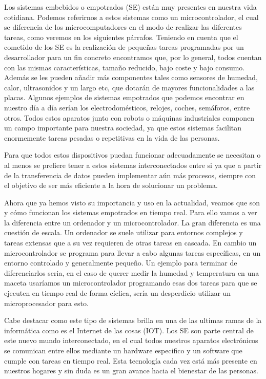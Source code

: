 
Los sistemas embebidos o empotrados (SE) están muy presentes en nuestra vida cotidiana. Podemos referirnos a estos sistemas como un microcontrolador, el cual se diferencia de los microcomputadores en el modo de realizar las diferentes tareas, como veremos en los siguientes párrafos. Teniendo en cuenta que el cometido de los SE es la realización de pequeñas tareas programadas por un desarrollador para un fin concreto encontramos que, por lo general, todos cuentan con las mismas características, tamaño reducido, bajo coste y bajo consumo. Además se les pueden añadir más componentes tales como sensores de humedad, calor, ultrasonidos y un largo etc, que dotarán de mayores funcionalidades a las placas. Algunos ejemplos de sistemas empotrados que podemos encontrar en nuestro día a día serían los electrodomésticos, relojes, coches, semáforos, entre otros. Todos estos aparatos junto con robots o máquinas industriales componen un campo importante para nuestra sociedad, ya que estos sistemas facilitan enormemente tareas pesadas o repetitivas en la vida de las personas. 

Para que todos estos dispositivos puedan funcionar adecuadamente se necesitan o al menos se prefiere tener a estos sistemas interconectados entre si ya que a partir de la transferencia de datos pueden implementar aún más procesos, siempre con el objetivo de ser más eficiente a la hora de solucionar un problema.


Ahora que ya hemos visto su importancia y uso en la actualidad, veamos que son y cómo funcionan los sistemas empotrados en tiempo real. Para ello vamos a ver la diferencia entre un ordenador y un microcontrolador. La gran diferencia es una cuestión de escala. Un ordenador se suele utilizar para entornos complejos y tareas extensas que a su vez requieren de otras tareas en cascada. En cambio un microcontrolador se programa para llevar a cabo algunas tareas específicas, en un entorno controlado y generalmente pequeño. Un ejemplo para terminar de diferenciarlos seria, en el caso de querer medir la humedad y temperatura en una maceta usaríamos un microcontrolador programando esas dos tareas para que se ejecuten en tiempo real de forma cíclica, sería un desperdicio utilizar un microprocesador para esto.

Cabe destacar como este tipo de sistemas brilla en una de las ultimas ramas de la informática como es el Internet de las cosas (IOT). Los SE son parte central de este nuevo mundo interconectado, en el cual todos nuestros aparatos electrónicos se comunican entre ellos mediante un hardware especifico y un software que cumple con tareas en tiempo real. Esta tecnología cada vez está más presente en nuestros hogares y sin duda es un gran avance hacia el bienestar de las personas.



